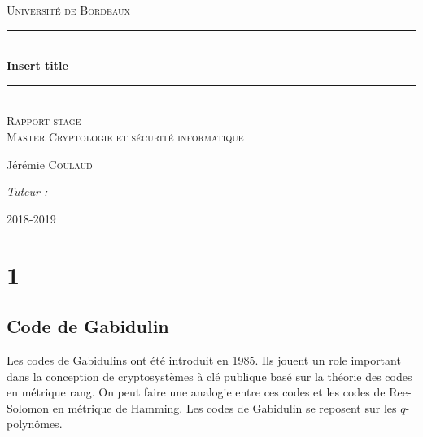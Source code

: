 \documentclass[12pt]{article}
\title{}
\author{Jérémie Coulaud}
\newcommand{\HRule}{\rule{\linewidth}{0.5mm}}
\begin{document}
\newtheorem{prop}{Proposition}
\newtheorem{defi}{Définition}
\newtheorem{thm}{Théorème}
\begin{titlepage}

\begin{center}
\textsc{\LARGE Université de Bordeaux} \\[2.0cm]

\vspace{3cm}
    \HRule \\[0.4cm]
    { \huge \bfseries Insert title\\[0.4cm] }
 \HRule \\[2cm]

 \textsc{\large Rapport stage} \\[1.5cm]
 \textsc{\large Master Cryptologie et sécurité informatique} \\[1.5cm]
 \vspace{4cm}
    \begin{minipage}{0.4\textwidth}
      \begin{flushleft} \large
        Jérémie \textsc{Coulaud}\\
      \end{flushleft}
    \end{minipage}
    \begin{minipage}{0.4\textwidth}
      \begin{flushright} \large
        \emph{Tuteur :}  \textsc{}\\
      \end{flushright}
    \end{minipage}

 \vfill
    {\large 2018-2019}
\end{center}
\end{titlepage}
\newpage
\tableofcontents
\newpage
\section{1}


\subsection{Code de Gabidulin}
Les codes de Gabidulins ont été introduit en 1985. Ils jouent un role important dans la conception de cryptosystèmes à clé publique basé sur la théorie des codes en métrique rang. On peut faire une analogie entre ces codes et les codes de Ree-Solomon en métrique de Hamming. Les codes de Gabidulin se reposent sur les $q$-polynômes.
\end{document}
